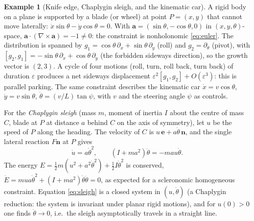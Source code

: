 \documentclass[11pt,a4paper]{article}
\theoremstyle{definition}
\newtheorem{example}{Example}[section]
\theoremstyle{plain}
\theoremstyle{remark}
\begin{document}
\begin{example}[Knife edge, Chaplygin sleigh, and the kinematic car]\label{ex:sleigh}
A rigid body on a plane is supported by a blade (or wheel) at point $P=(x,y)$ that cannot
move laterally: $\dot x\sin\theta-\dot y\cos\theta=0$. With $\mathbf a=(\sin\theta,-\cos\theta,0)$
in $(x,y,\theta)$-space, $\mathbf a\cdot(\nabla\times\mathbf a)=-1\ne0$: the constraint is nonholonomic
\eqref{eq:euler}. The distribution is spanned by $g_1=\cos\theta\,\partial_x+\sin\theta\,\partial_y$ (roll)
and $g_2=\partial_\theta$ (pivot), with $[g_2,g_1]=-\sin\theta\,\partial_x+\cos\theta\,\partial_y$
(the forbidden sideways direction), so the growth vector is $(2,3)$. A cycle of four
motions (roll, turn, roll back, turn back) of duration $\varepsilon$ produces a net sideways
displacement $\varepsilon^2[g_1,g_2]+O(\varepsilon^3)$: this is parallel parking. The
same constraint describes the kinematic car $\dot x=v\cos\theta$, $\dot y=v\sin\theta$,
$\dot\theta=(v/L)\tan\psi$, with $v$ and the steering angle $\psi$ as controls.

For the \emph{Chaplygin sleigh} (mass $m$, moment of inertia $I$ about the centre of mass $C$,
blade at $P$ at distance $a$ behind $C$ on the axis of symmetry), let $u$ be the speed of $P$
along the heading. The velocity of $C$ is $u\,\mathbf e+a\dot\theta\,\mathbf n$, and the single lateral
reaction $F\mathbf n$ at $P$ gives
\begin{equation}\label{eq:sleigh}
  \dot u=a\dot\theta^2,\qquad (I+ma^2)\ddot\theta=-mau\dot\theta .
\end{equation}
The energy $E=\tfrac12m(u^2+a^2\dot\theta^2)+\tfrac12I\dot\theta^2$ is conserved,
$\dot E=mua\dot\theta^2+(I+ma^2)\dot\theta\ddot\theta=0$, as expected for a scleronomic homogeneous
constraint. Equation \eqref{eq:sleigh} is a closed system in $(u,\dot\theta)$ (a Chaplygin reduction: the
system is invariant under planar rigid motions), and for $u(0)>0$ one finds $\dot\theta\to0$, i.e.\ the sleigh
asymptotically travels in a straight line.
\end{example}
\end{document}
